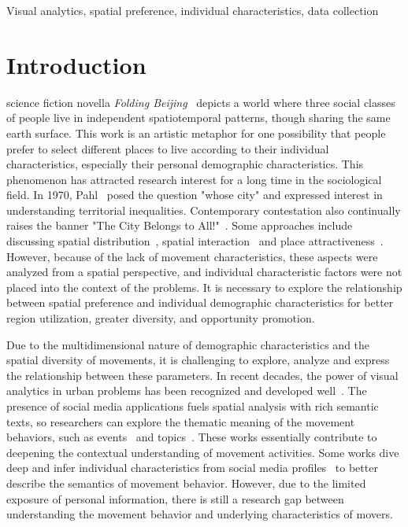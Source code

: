 \documentclass{ieeeaccess}
\begin{document}
\begin{keywords}
Visual analytics, spatial preference, individual characteristics, data collection
\end{keywords}

\titlepgskip=-15pt

\maketitle

\section{Introduction}
\label{sec:introduction}
 science fiction novella \textit{Folding Beijing}~\cite{hao2016_foldingbeijing} depicts a world where three social classes of people live in independent spatiotemporal patterns, though sharing the same earth surface. This work is an artistic metaphor for one possibility that people prefer to select different places to live according to their individual characteristics, especially their personal demographic characteristics. This phenomenon has attracted research interest for a long time in the sociological field. In 1970, Pahl~\cite{pahl1975whose} posed the question "whose city" and expressed interest in understanding territorial inequalities. Contemporary contestation also continually raises the banner "The City Belongs to All!"~\cite{Mayer2017_whosecity}. Some approaches include discussing spatial distribution~\cite{RN909}, spatial interaction~\cite{RN1692} and place attractiveness~\cite{retailcity}. However, because of the lack of movement characteristics, these aspects were analyzed from a spatial perspective, and individual characteristic factors were not placed into the context of the problems. It is necessary to explore the relationship between spatial preference and individual demographic characteristics for better region utilization, greater diversity, and opportunity promotion.

Due to the multidimensional nature of demographic characteristics and the spatial diversity of movements, it is challenging to explore, analyze and express the relationship between these parameters. In recent decades, the power of visual analytics in urban problems has been recognized and developed well~\cite{wang2013visual, zeng2013visualizing}. The presence of social media applications fuels spatial analysis with rich semantic texts, so researchers can explore the thematic meaning of the movement behaviors, such as events~\cite{chen2017map} and topics~\cite{bosch2013scatterblogs2}. These works essentially contribute to deepening the contextual understanding of movement activities.  Some works dive deep and infer individual characteristics from social media profiles~\cite{peddinti2014internet} to better describe the semantics of movement behavior. However, due to the limited exposure of personal information, there is still a research gap between understanding the movement behavior and underlying characteristics of movers.
\end{document}

